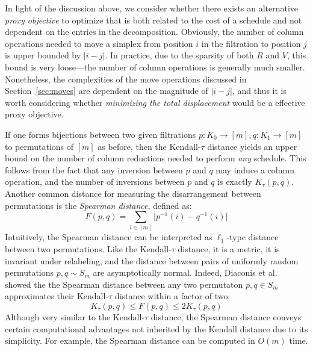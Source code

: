 \documentclass{article} %
\DeclareMathOperator*{\argmin}{arg\,min}
\begin{document}
In light of the discussion above, we consider whether there exists an alternative \emph{proxy objective} to optimize that is both related to the cost of a schedule and not dependent on the entries in the decomposition. 
Obviously, the number of column operations needed to move a simplex from position $i$ in the filtration to position $j$ is upper bounded by $\lvert i - j \rvert$. In practice, due to the sparsity of both $R$ and $V$, this bound is very loose---the number of column operations is generally much smaller. Nonetheless, the complexities of the move operations discussed in Section~\ref{sec:moves} are dependent on the magnitude of $\lvert i - j \rvert$, and thus it is worth considering whether  \emph{minimizing the total displacement} would be a effective proxy objective. 

If one forms bijections between two given filtrations $p: K_0 \to [m], q: K_1 \to [m]$ to permutations of $[m]$ as before, then the Kendall-$\tau$ distance yields an upper bound on the number of column reductions needed to perform \emph{any} schedule. This follows from the fact that any inversion between $p$ and $q$ may induce a column operation, and the number of inversions between $p$ and $q$ is exactly $K_{\tau}(p, q)$. Another common distance for measuring the disarrangement between permutations is the \emph{Spearman distance}, defined as:
\begin{equation}\label{eq:spearman_dist}
F(p, q) = \sum\limits_{i \in [m]} \lvert p^{-1}(i) - q^{-1}(i) \rvert
\end{equation}
Intuitively, the Spearman distance can be interpreted as $\ell_1$-type distance between two permutations. Like the Kendall-$\tau$ distance, it is a metric, it is invariant under relabeling, and the distance between pairs of uniformly random permutations $p, q \sim S_m$ are asymptotically normal. Indeed, Diaconis et al.~\cite{diaconis1977spearman} showed the the Spearman distance between any two permutaton $p, q \in S_m$ approximates their Kendall-$\tau$ distance within a factor of two: 
\begin{equation}\label{eq:diaconis_inequality}
K_\tau(p, q) \leq F(p, q) \leq 2 K_\tau(p, q)
\end{equation}
Although very similar to the Kendall-$\tau$ distance, the Spearman distance conveys certain computational advantages not inherited by the Kendall distance due to its simplicity. 
For example, the Spearman distance can be computed in $O(m)$ time.

\end{document}
